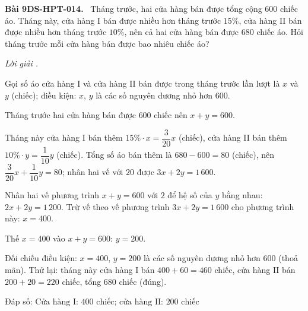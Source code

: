 \documentclass[12pt,a4paper]{article}
\newenvironment{problem}[1][]{\par\medskip\noindent\textbf{Bài #1.}\ }{\par}
\newenvironment{solution}[1][]{\par\noindent\textit{Lời giải #1.}\par}{\par}
\begin{document}
\begin{problem}[9DS-HPT-014]
Tháng trước, hai cửa hàng bán được tổng cộng $600$ chiếc áo. Tháng này, cửa hàng I bán được nhiều hơn tháng trước $15\%$, cửa hàng II bán được nhiều hơn tháng trước $10\%$, nên cả hai cửa hàng bán được $680$ chiếc áo. Hỏi tháng trước mỗi cửa hàng bán được bao nhiêu chiếc áo?

\begin{solution}
Gọi số áo cửa hàng I và cửa hàng II bán được trong tháng trước lần lượt là $x$ và $y$ (chiếc); điều kiện: $x$, $y$ là các số nguyên dương nhỏ hơn $600$.

Tháng trước hai cửa hàng bán được $600$ chiếc nên $x + y = 600$.

Tháng này cửa hàng I bán thêm $15\% \cdot x = \dfrac{3}{20}x$ (chiếc), cửa hàng II bán thêm $10\% \cdot y = \dfrac{1}{10}y$ (chiếc). Tổng số áo bán thêm là $680 - 600 = 80$ (chiếc), nên $\dfrac{3}{20}x + \dfrac{1}{10}y = 80$; nhân hai vế với $20$ được $3x + 2y = 1\,600$.

Nhân hai vế phương trình $x + y = 600$ với $2$ để hệ số của $y$ bằng nhau: $2x + 2y = 1\,200$. Trừ vế theo vế phương trình $3x + 2y = 1\,600$ cho phương trình này: $x = 400$.

Thế $x = 400$ vào $x + y = 600$: $y = 200$.

Đối chiếu điều kiện: $x = 400$, $y = 200$ là các số nguyên dương nhỏ hơn $600$ (thoả mãn). Thử lại: tháng này cửa hàng I bán $400 + 60 = 460$ chiếc, cửa hàng II bán $200 + 20 = 220$ chiếc, tổng $680$ chiếc (đúng).

Đáp số: $\boxed{\text{Cửa hàng I: } 400 \text{ chiếc; cửa hàng II: } 200 \text{ chiếc}}$
\end{solution}
\end{problem}
\end{document}
